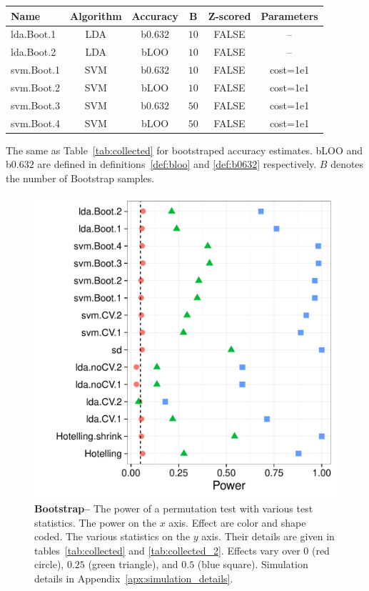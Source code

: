 \documentclass[12pt,a4paper]{article}
\theoremstyle{definition}
\begin{document}
\bigskip

\begin{tcolorbox}
\centering
\begin{tabular}{l|c|c|c|c|c}
Name & Algorithm & Accuracy & B & Z-scored & Parameters\\ 
\hline
\hline
lda.Boot.1 & LDA & b$0.632$ & $10$ & FALSE &  -- \\ 
lda.Boot.2 & LDA & bLOO 	& $10$ & FALSE &  -- \\ 
svm.Boot.1 & SVM & b$0.632$ & $10$ & FALSE & cost=1e1 \\ 
svm.Boot.2 & SVM & bLOO 	& $10$ & FALSE & cost=1e1 \\ 
svm.Boot.3 & SVM & b$0.632$ & $50$ & FALSE & cost=1e1 \\ 
svm.Boot.4 & SVM & bLOO 	& $50$ & FALSE & cost=1e1 \\ 
\end{tabular} 
\captionsetup{type=table}
\caption{
The same as Table~\ref{tab:collected} for bootstraped accuracy estimates. 
bLOO and b$0.632$ are defined in definitions~\ref{def:bloo} and \ref{def:b0632} respectively.
$B$ denotes the number of Bootstrap samples. } 
\label{tab:collected_2}
\end{tcolorbox}


\begin{figure}[ht]
\centering
	  \includegraphics[width=0.7\linewidth]{"art/2016-08-09 20:09:20"}
	  \caption{
		  \textbf{Bootstrap--}
		  The power of a permutation test with various test statistics. 
		  The power on the $x$ axis. 
		  Effect are color and shape coded. 
		  The various statistics on the $y$ axis. 
		  Their details are given in tables~\ref{tab:collected} and \ref{tab:collected_2}. 
		  Effects vary over $0$ (red circle), $0.25$ (green triangle), and $0.5$ (blue square). 
		  Simulation details in Appendix~\ref{apx:simulation_details}.
		  } 
	\label{fig:bootstrap}
\end{figure}
\end{document}
